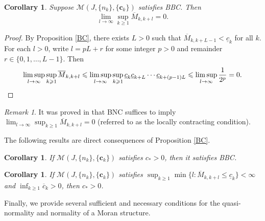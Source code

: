 \documentclass[12pt]{amsart}
\numberwithin{equation}{section}
\theoremstyle{plain}
\newtheorem{corollary}[theorem]{Corollary}
\theoremstyle{remark}
\newtheorem{remark}[theorem]{Remark}
\theoremstyle{definition}
\newcommand{\om}{\overline{M}}
\newcommand{\ccc}{\mathbf{c}}
\newcommand{\f}{\frac}
\newcommand{\oc}{\overline{c}}
\newcommand{\uc}{\underline{c}}
\renewcommand{\ge}{\geqslant}
\renewcommand{\le}{\leqslant}
\begin{document}
	
	
	\begin{corollary}\label{contr}
		Suppose $ \mathcal{M}(J,\{n_k\},\{\ccc_k\})$ satisfies BBC.
		Then
		\[
		\lim_{l\to \infty}\sup_{k\ge 1} \om_{k,k+l}=0.
		\]
	\end{corollary}
	\begin{proof}
	By Proposition \ref{BC}, there exists $L>0$ such that $\om_{k,k+L-1}<\uc_k$ for all $k$. For each $l>0$, write $l=pL+r$ for some integer $p>0$ and remainder $r\in\{0,1,\ldots,L-1\}$. Then
		\begin{equation*}
			\begin{aligned}
				\limsup_{l\to \infty}\sup_{k\ge 1} \om_{k,k+l}\le 	\limsup_{l\to \infty}\sup_{k\ge 1} \uc_k\uc_{k+L}\cdots\uc_{k+(p-1)L}\le \limsup_{l\to \infty}\f1{2^p}=0.
			\end{aligned}\qedhere
		\end{equation*}
	\end{proof}
	
	
	\begin{remark}
		It was proved in \cite{kaenmaki2024regularity} that BNC suffices to imply $\lim_{l\to \infty}\sup_{k\ge 1} \om_{k,k+l}=0$ (referred to as the locally contracting condition).
	\end{remark}
	
	The following results are direct consequences of Proposition \ref{BC}.
	\begin{corollary}\label{c_*->BC}
		If $\mathcal{M}(J,\{n_k\},\{\ccc_k\})$ satisfies $c_*>0$, then it satisfies BBC.
	\end{corollary}
	\begin{corollary}
		If $\mathcal{M}(J,\{n_k\},\{\ccc_k\})$ satisfies $\sup_{k\ge 1}\min\big\{l:\om_{k,k+l}\le \uc_k\big\}<\infty$ and $\inf_{k\ge 1}\oc_k>0$, then $c_*>0$.
	\end{corollary}
	

	
Finally, we provide several sufficient and necessary conditions for the quasi-normality and normality of a Moran structure.
	
\end{document}
